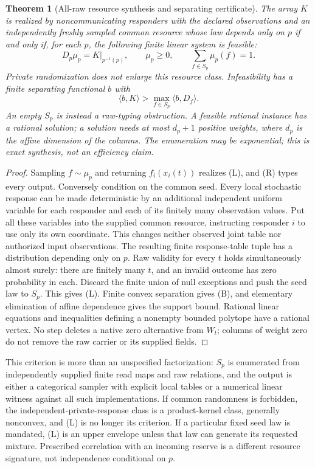 \documentclass[11pt]{article}
\newtheorem{theorem}{Theorem}\newtheorem{proposition}{Proposition}\newtheorem{corollary}{Corollary}
\begin{document}
\begin{theorem}[All-raw resource synthesis and separating certificate]\label{thm:polytope}
The array $K$ is realized by noncommunicating responders with the declared observations and an independently freshly sampled common resource whose law depends only on $p$ if and only if, for each $p$, the following finite linear system is feasible:
\[
 D_p\mu_p=K|_{p^{-1}(p)},\qquad \mu_p\geq0,\qquad
 \sum_{f\in S_p}\mu_p(f)=1.\tag{L}
\]
Private randomization does not enlarge this resource class. Infeasibility has a finite separating functional $b$ with
\[
 \langle b,K\rangle>\max_{f\in S_p}\langle b,D_f\rangle.
\tag{B}
\]
An empty $S_p$ is instead a raw-typing obstruction. A feasible rational instance has a rational solution; a solution needs at most $d_p+1$ positive weights, where $d_p$ is the affine dimension of the columns. The enumeration may be exponential; this is exact synthesis, not an efficiency claim.
\end{theorem}
\begin{proof}
Sampling $f\sim\mu_p$ and returning $f_i(x_i(t))$ realizes (L), and (R) types every output. Conversely condition on the common seed. Every local stochastic response can be made deterministic by an additional independent uniform variable for each responder and each of its finitely many observation values. Put all these variables into the supplied common resource, instructing responder $i$ to use only its own coordinate. This changes neither observed joint table nor authorized input observations. The resulting finite response-table tuple has a distribution depending only on $p$. Raw validity for every $t$ holds simultaneously almost surely: there are finitely many $t$, and an invalid outcome has zero probability in each. Discard the finite union of null exceptions and push the seed law to $S_p$. This gives (L). Finite convex separation gives (B), and elementary elimination of affine dependence gives the support bound. Rational linear equations and inequalities defining a nonempty bounded polytope have a rational vertex. No step deletes a native zero alternative from $W_t$; columns of weight zero do not remove the raw carrier or its supplied fields.
\end{proof}

This criterion is more than an unspecified factorization: $S_p$ is enumerated from independently supplied finite read maps and raw relations, and the output is either a categorical sampler with explicit local tables or a numerical linear witness against all such implementations. If common randomness is forbidden, the independent-private-response class is a product-kernel class, generally nonconvex, and (L) is no longer its criterion. If a particular fixed seed law is mandated, (L) is an upper envelope unless that law can generate its requested mixture. Prescribed correlation with an incoming reserve is a different resource signature, not independence conditional on $p$.
\end{document}
